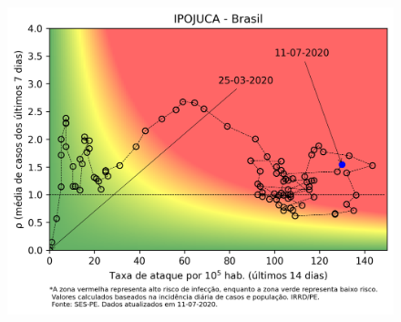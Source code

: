 \documentclass[]{article}
\begin{document}
\begin{figure}[!h]
	\begin{minipage}[t]{4cm}
	\centering
	\includegraphics[scale=0.5]{../IPOJUCA.png}
	\vspace{0.2cm}
	\end{minipage}

\end{figure}
\end{document}
